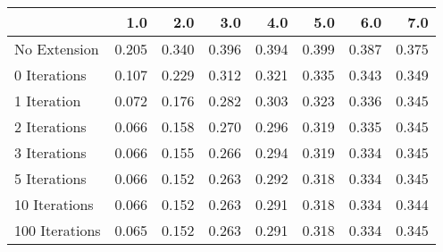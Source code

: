 \begin{tabular}{lrrrrrrr}
\toprule
{} &   1.0 &   2.0 &   3.0 &   4.0 &   5.0 &   6.0 &   7.0 \\
\midrule
No Extension   & 0.205 & 0.340 & 0.396 & 0.394 & 0.399 & 0.387 & 0.375 \\
0 Iterations   & 0.107 & 0.229 & 0.312 & 0.321 & 0.335 & 0.343 & 0.349 \\
1 Iteration    & 0.072 & 0.176 & 0.282 & 0.303 & 0.323 & 0.336 & 0.345 \\
2 Iterations   & 0.066 & 0.158 & 0.270 & 0.296 & 0.319 & 0.335 & 0.345 \\
3 Iterations   & 0.066 & 0.155 & 0.266 & 0.294 & 0.319 & 0.334 & 0.345 \\
5 Iterations   & 0.066 & 0.152 & 0.263 & 0.292 & 0.318 & 0.334 & 0.345 \\
10 Iterations  & 0.066 & 0.152 & 0.263 & 0.291 & 0.318 & 0.334 & 0.344 \\
100 Iterations & 0.065 & 0.152 & 0.263 & 0.291 & 0.318 & 0.334 & 0.345 \\
\bottomrule
\end{tabular}
